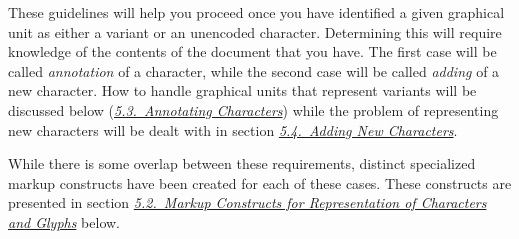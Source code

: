These guidelines will help you proceed once you have identified a given graphical unit as either a variant or an unencoded character. Determining this will require knowledge of the contents of the document that you have. The first case will be called \textit{annotation} of a character, while the second case will be called \textit{adding} of a new character. How to handle graphical units that represent variants will be discussed below (\textit{\hyperref[D25-30]{5.3.\ Annotating Characters}}) while the problem of representing new characters will be dealt with in section \textit{\hyperref[D25-40]{5.4.\ Adding New Characters}}.\par
While there is some overlap between these requirements, distinct specialized markup constructs have been created for each of these cases. These constructs are presented in section \textit{\hyperref[D25-20]{5.2.\ Markup Constructs for Representation of Characters and Glyphs}} below.

